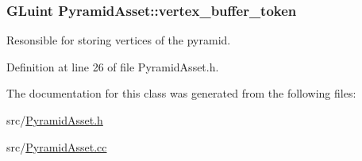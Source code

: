 \subsubsection[{vertex\+\_\+buffer\+\_\+token}]{\setlength{\rightskip}{0pt plus 5cm}G\+Luint Pyramid\+Asset\+::vertex\+\_\+buffer\+\_\+token\hspace{0.3cm}{\ttfamily [private]}}\label{class_pyramid_asset_a54d9cec42bc77d07a66e6c1cd55049b0}
Resonsible for storing vertices of the pyramid. 

Definition at line 26 of file Pyramid\+Asset.\+h.



The documentation for this class was generated from the following files\+:\begin{DoxyCompactItemize}
\item 
src/\hyperlink{_pyramid_asset_8h}{Pyramid\+Asset.\+h}\item 
src/\hyperlink{_pyramid_asset_8cc}{Pyramid\+Asset.\+cc}\end{DoxyCompactItemize}
